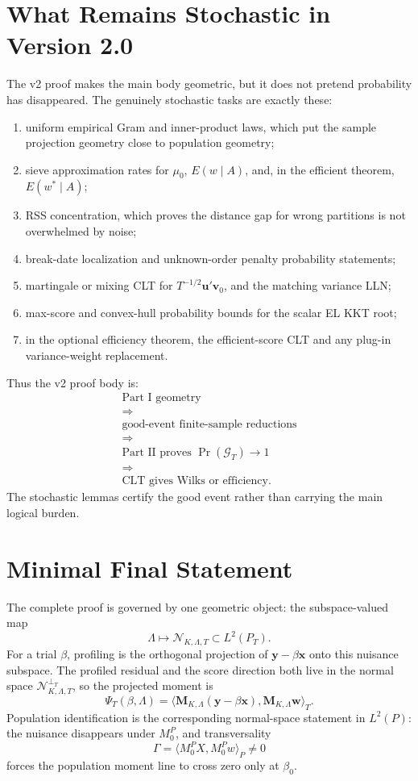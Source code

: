 \documentclass[12pt]{article}
\numberwithin{equation}{section}
\theoremstyle{definition}
\newcommand{\N}{\mathcal N}
\newcommand{\innerT}[2]{\langle #1,#2\rangle_T}
\newcommand{\innerP}[2]{\langle #1,#2\rangle_P}
\begin{document}
\section{What Remains Stochastic in Version 2.0}

The v2 proof makes the main body geometric, but it does not pretend probability
has disappeared. The genuinely stochastic tasks are exactly these:
\begin{enumerate}[leftmargin=2em]
\item uniform empirical Gram and inner-product laws, which put the sample
projection geometry close to population geometry;
\item sieve approximation rates for \(\mu_0\), \(E(w\mid A)\), and, in the
efficient theorem, \(E(w^*\mid A)\);
\item RSS concentration, which proves the distance gap for wrong partitions is
not overwhelmed by noise;
\item break-date localization and unknown-order penalty probability statements;
\item martingale or mixing CLT for \(T^{-1/2}\bm u'\bm v_0\), and the matching
variance LLN;
\item max-score and convex-hull probability bounds for the scalar EL KKT root;
\item in the optional efficiency theorem, the efficient-score CLT and any
plug-in variance-weight replacement.
\end{enumerate}

Thus the v2 proof body is:
\[
\begin{array}{c}
    \text{Part I geometry}\\
    \Longrightarrow\\
    \text{good-event finite-sample reductions}\\
    \Longrightarrow\\
    \text{Part II proves }\Pr(\mathcal G_T)\to1\\
    \Longrightarrow\\
    \text{CLT gives Wilks or efficiency.}
\end{array}
\]
The stochastic lemmas certify the good event rather than carrying the main logical burden.
\section{Minimal Final Statement}

The complete proof is governed by one geometric object: the subspace-valued map
\[
    \Lambda\longmapsto \N_{K,\Lambda,T}\subset L^2(P_T).
\]
For a trial \(\beta\), profiling is the orthogonal projection of
\(\bm y-\beta\bm x\) onto this nuisance subspace. The profiled residual and the
score direction both live in the normal space
\(\N_{K,\Lambda,T}^{\perp_T}\), so the projected moment is
\[
    \Psi_T(\beta,
    \Lambda)=\innerT{\bm M_{K,\Lambda}(\bm y-\beta\bm x)}
                    {\bm M_{K,\Lambda}\bm w}.
\]
Population identification is the corresponding normal-space statement in
\(L^2(P)\): the nuisance disappears under \(M_0^P\), and transversality
\[
    \Gamma=\innerP{M_0^PX}{M_0^Pw}\ne0
\]
forces the population moment line to cross zero only at \(\beta_0\).
\end{document}
